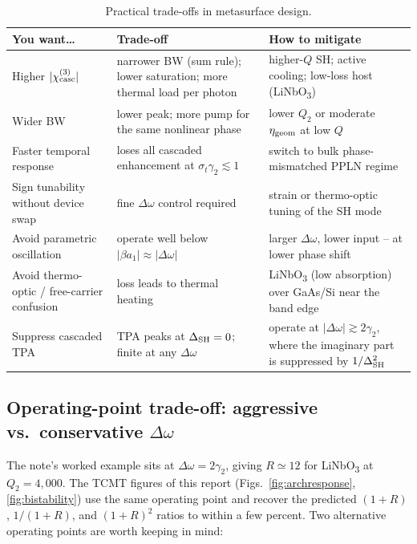 \documentclass[11pt,a4paper]{article}
\newcommand{\chithree}{\chi^{(3)}}
\newcommand{\Dom}{\Delta\omega}
\newcommand{\DSH}{\Delta_{\rm SH}}
\newcommand{\geom}{{\rm geom}}
\begin{document}
\begin{table}[H]
\centering
\renewcommand{\arraystretch}{1.25}
\setlength{\tabcolsep}{4pt}
\footnotesize
\begin{tabular}{>{\raggedright\arraybackslash}p{}
                >{\raggedright\arraybackslash}p{}
                >{\raggedright\arraybackslash}p{}}
\toprule
You want\dots & Trade-off & How to mitigate \\
\midrule
Higher $|\chithree_{\rm casc}|$ &
narrower BW (sum rule); lower saturation; more thermal load per photon &
higher-$Q$ SH; active cooling; low-loss host
(LiNbO\textsubscript{3}) \\
Wider BW &
lower peak; more pump for the same nonlinear phase &
lower $Q_2$ or moderate $\eta_\geom$ at low $Q$ \\
Faster temporal response &
loses all cascaded enhancement at $\sigma_t \gamma_2 \lesssim 1$ &
switch to bulk phase-mismatched PPLN regime \\
Sign tunability without device swap &
fine $\Dom$ control required &
strain or thermo-optic tuning of the SH mode \\
Avoid parametric oscillation &
operate well below $|\beta a_1| \approx |\Dom|$ &
larger $\Dom$, lower input -- at lower phase shift \\
Avoid thermo-optic / free-carrier confusion &
loss leads to thermal heating &
LiNbO\textsubscript{3} (low absorption) over GaAs/Si near the band
edge \\
Suppress cascaded TPA &
TPA peaks at $\DSH = 0$; finite at any $\Dom$ &
operate at $|\Dom| \gtrsim 2\gamma_2$, where the imaginary part is
suppressed by $1/\DSH^{2}$ \\
\bottomrule
\end{tabular}
\caption{Practical trade-offs in metasurface design.}
\label{tab:tradeoffs}
\end{table}

\subsection{\texorpdfstring{Operating-point trade-off: aggressive vs.\ conservative $\Dom$}{Operating-point trade-off: aggressive vs. conservative Delta-omega}}\label{sec:tradeoff_R}

The note's worked example sits at $\Dom = 2\gamma_2$, giving
$R \simeq 12$ for LiNbO\textsubscript{3} at $Q_2 = 4{,}000$. The TCMT
figures of this report (Figs.~\ref{fig:archresponse},
\ref{fig:bistability}) use the same operating point and recover the
predicted $(1+R)$, $1/(1+R)$, and $(1+R)^{2}$ ratios to within a few
percent. Two alternative operating points are worth keeping in mind:
\end{document}

